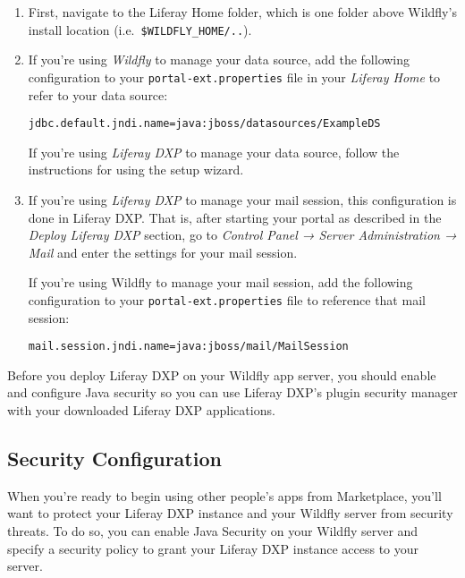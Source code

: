 \begin{enumerate}
\def\labelenumi{\arabic{enumi}.}
\item
  First, navigate to the Liferay Home folder, which is one folder above
  Wildfly's install location (i.e.~\texttt{\$WILDFLY\_HOME/..}).
\item
  If you're using \emph{Wildfly} to manage your data source, add the
  following configuration to your \texttt{portal-ext.properties} file in
  your \emph{Liferay Home} to refer to your data source:

\begin{verbatim}
jdbc.default.jndi.name=java:jboss/datasources/ExampleDS
\end{verbatim}

  If you're using \emph{Liferay DXP} to manage your data source, follow
  the instructions for using the setup wizard.
\item
  If you're using \emph{Liferay DXP} to manage your mail session, this
  configuration is done in Liferay DXP. That is, after starting your
  portal as described in the \emph{Deploy Liferay DXP} section, go to
  \emph{Control Panel → Server Administration → Mail} and enter the
  settings for your mail session.

  If you're using Wildfly to manage your mail session, add the following
  configuration to your \texttt{portal-ext.properties} file to reference
  that mail session:

\begin{verbatim}
mail.session.jndi.name=java:jboss/mail/MailSession
\end{verbatim}
\end{enumerate}

Before you deploy Liferay DXP on your Wildfly app server, you should
enable and configure Java security so you can use Liferay DXP's plugin
security manager with your downloaded Liferay DXP applications.

\subsection{Security Configuration}\label{security-configuration}

When you're ready to begin using other people's apps from Marketplace,
you'll want to protect your Liferay DXP instance and your Wildfly server
from security threats. To do so, you can enable Java Security on your
Wildfly server and specify a security policy to grant your Liferay DXP
instance access to your server.

